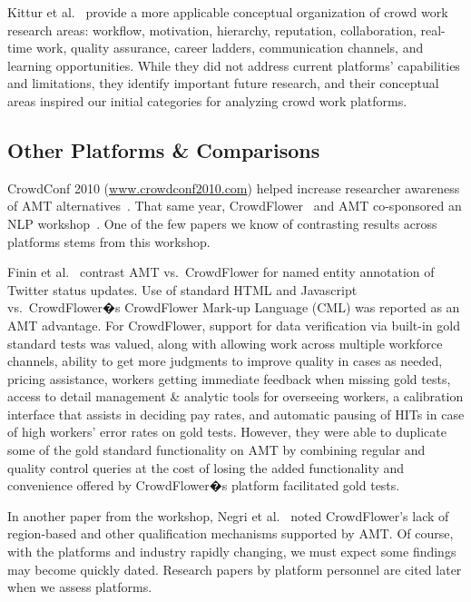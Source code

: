 \documentclass{sigchi}
\begin{document}
Kittur et al.~\cite{Kittur13} provide a more applicable conceptual organization of crowd work research areas: workflow, motivation, hierarchy, reputation, collaboration, real-time work, quality assurance, career ladders, communication channels, and learning opportunities. While they did not address current platforms' capabilities and limitations, they identify important future research, and their conceptual areas inspired our initial categories for analyzing crowd work platforms. 

\vspace{-5pt} \subsection{Other Platforms \& Comparisons}

CrowdConf 2010 (\url{www.crowdconf2010.com}) helped increase researcher awareness of AMT alternatives~\cite{ipeirotis-micro-services,ipeirotis-verticals}. That same year, CrowdFlower~\cite{Le10,Oleson11} and AMT co-sponsored an NLP workshop~\cite{Burch-amt10}. One of the few papers we know of contrasting results across platforms stems from this workshop. 

Finin et al.~\cite{finin2010annotating} contrast AMT vs.\ CrowdFlower for named entity annotation of Twitter status updates. Use of standard HTML and Javascript vs.\ CrowdFlower�s CrowdFlower Mark-up Language (CML) was reported as an AMT advantage. For CrowdFlower, support for data verification via built-in gold standard tests was valued, along with allowing work across multiple workforce channels, ability to get more judgments to improve quality in cases as needed, pricing assistance, workers getting immediate feedback when missing gold tests, access to detail management \& analytic tools for overseeing workers, a calibration interface that assists in deciding pay rates, and automatic pausing of HITs in case of high workers' error rates on gold tests. However, they were able to duplicate some of the gold standard functionality on AMT by combining regular and quality control queries at the cost of losing the added functionality and convenience offered by CrowdFlower�s platform facilitated gold tests. 

In another paper from the workshop, Negri et al.~\cite{negri2010creating} noted CrowdFlower's lack of region-based and other qualification mechanisms supported by AMT. Of course, with the platforms and industry rapidly changing, we must expect some findings may become quickly dated.
Research papers by platform personnel are cited later when we assess platforms.
\end{document}
